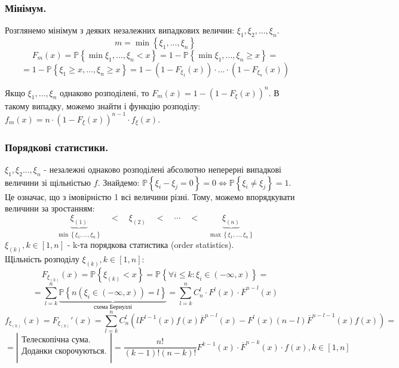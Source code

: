 \subsubsection{Мінімум.}
Розглянемо мінімум з деяких незалежних випадкових величин: $ \xi_1 , \xi_2, ... , \xi_n$.
$$m = \min \left\lbrace \xi_1, ..., \xi_n \right\rbrace $$
$$ F_m (x) = \mathbb{P} \left\lbrace  \min{\xi_1, ..., \xi_n} < x\right\rbrace = 1 - \mathbb{P} \left\lbrace \min{\xi_1, ..., \xi_n} \geq  x \right\rbrace =
$$
$$
=  1 - \mathbb{P} \left\lbrace \xi_1 \geq x, ... , \xi_n \geq x  \right\rbrace  = 1 - \left( 1 - F_{\xi_1} (x) \right) \cdot ... \cdot \left( 1 - F_{\xi_n} (x) \right)
$$
\begin{center}
\end{center}
Якщо $\xi_1 , ..., \xi_n$ однаково розподілені, то $ F_m (x) = 1 - \left(  1- F_{\xi}(x) \right)^{n} $. В такому випадку, можемо знайти і функцію розподілу: $ f_m (x) = n \cdot \left( 1 - F_{\xi}(x) \right)^{n-1}  \cdot f_{\xi }(x)$.
\subsubsection{Порядкові статистики.}
$ \xi_1 , \xi_2 ... , \xi_n $ - незалежні однаково розподілені абсолютно неперерні випадкові величини зі щільністью $f$.
Знайдемо: $ \mathbb{P} \left\lbrace \xi_i - \xi_j = 0 \right\rbrace  = 0 \Leftrightarrow \mathbb{P} \left\lbrace \xi_i \neq \xi_j \right\rbrace = 1$. \\
Це означає, що з імовірністю 1 всі величини різні. Тому, можемо впорядкувати величини за зростанням:
$$
\underbrace{\xi_{(1)}}_{\min{\left\lbrace \xi_1, ..., \xi_n \right\rbrace }} \quad < \quad \xi_{(2)} \quad < \quad \cdots \quad < \quad \underbrace{\xi_{(n)}}_{\max{\left\lbrace \xi_1, ..., \xi_n \right\rbrace }}
$$
$ \xi_{(k)}, k \in [1, n]$ - k-та порядкова статистика (order statistics).\\
Щільність розподілу $\xi_{(k)}, k \in [1,n]:$
$$
F_{\xi_{(k)}}  (x) = \mathbb{P} \left\lbrace \xi_{(k)} < x \right\rbrace = \mathbb{P} \left\lbrace \forall i \leq k : \xi_i \in (-\infty, x) \right\rbrace =
$$
$$
=  \sum\limits_{l = k}^{n}{
\underbrace{\mathbb{P} \left\lbrace n( \xi_i \in (-\infty, x)) = l \right\rbrace}_{\text{схема Бернуллі}}
}=\sum\limits_{l = k}^{ n}{ C^l_n \cdot F^l(x) \cdot \overline{F}^{n-l}(x)}
$$
$$
f_{\xi_{(k)}} (x) = F_{\xi_{(k)}}'  (x) =  \sum\limits_{l = k}^{n}{ C^l_n \left(
l  F^{l-1} (x) f(x) \overline{F}^{n-l} (x) - F^l (x)(n-l) \overline{F}^{n-l-1}(x)  f(x)
 \right) }=
$$
$$
= \left| \begin{gathered}
 \text{Телескопічна сума.}\\
 \text{Доданки скорочуються.}\\
\end{gathered} \right| = \frac{n!}{(k-1)! (n-k)!} F^{k-1}(x) \cdot \overline{F}^{n-k}(x) \cdot f(x), k \in [1,n]
$$

